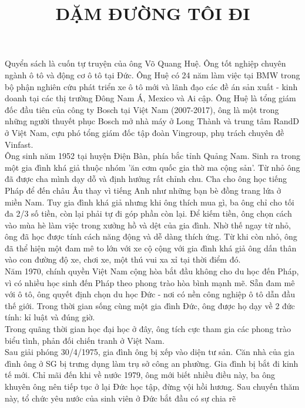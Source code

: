 \documentclass{article}
\title{DẶM ĐƯỜNG TÔI ĐI}
\newcommand\tab[1][1cm]{\hspace*{#1}}
\begin{document}
\maketitle

\tab Quyển sách là cuốn tự truyện của ông Võ Quang Huệ. Ông tốt nghiệp chuyên ngành ô tô và động cơ ô tô tại Đức.
Ông Huệ có 24 năm làm việc tại BMW trong bộ phận nghiên cứu phát triển xe ô tô mới và lãnh đạo các đề án
sản xuất - kinh doanh tại các thị trường Đông Nam Á, Mexico và Ai cập. Ông Huệ là tổng giám đốc đầu tiên của công 
ty Bosch tại Việt Nam (2007-2017), ông là một trong những người thuyết phục Bosch mở nhà máy ở Long Thành và trung tâm
RandD ở Việt Nam, cựu phó tổng giám đốc tập đoàn Vingroup, phụ trách chuyên đề Vinfast.\\

\tab Ông sinh năm 1952 tại huyện Điện Bàn, phía bắc tỉnh Quảng Nam. Sinh ra trong một gia đình khá giả thuộc nhóm 
'ăn cơm quốc gia thờ ma cộng sản'. Từ nhỏ ông đã được cha mình dạy dỗ và định hướng rất chỉnh chu. Cha cho ông học 
tiếng Pháp để đến châu Âu thay vì tiếng Anh như những bạn bè đồng trang lứa ở miền Nam. Tuy gia đình khá giả nhưng 
khi ông thích mua gì, ba ông chỉ cho tối đa 2/3 số tiền, còn lại phải tự đi góp phần còn lại. Để kiếm tiền, 
ông chọn cách vào mùa hè làm việc trong xưởng hồ và dệt của gia đình. Nhờ thế ngay từ nhỏ, ông đã học được tính cách 
năng động và dễ dàng thích ứng. Từ khi còn nhỏ, ông đã thể hiện một đam mê to lớn với xe cộ cộng với gia đình khá giả
ông dấn thân vào con đường độ xe, chơi xe, một thú vui xa xỉ tại thời điểm đó. \\
\tab Năm 1970, chính quyền Việt Nam cộng hòa bắt đầu không cho du học đến Pháp, vì có nhiều học sinh đến Pháp theo 
phong trào hòa bình mạnh mẽ. Sẵn đam mê với ô tô, ông quyết định chọn du học Đức - nơi có nền công nghiệp ô tô dẫn 
đầu thế giới. Trong thời gian sống cùng một gia đình Đức, ông được họ dạy về 2 đức tính: kỉ luật và đúng giờ.\\
\tab Trong quãng thời gian học đại học ở đây, ông tích cực tham gia các phong trào biểu tình, phản đối chiến tranh ở 
Việt Nam.\\
\tab Sau giải phóng 30/4/1975, gia đình ông bị xếp vào diện tư sản. Căn nhà của gia đình ông ở SG bị trưng dụng làm 
trụ sở công an phường. Gia đình bị bắt đi kinh tế mới. Chỉ mãi đến khi về nước 1979, ông mới biết nhiều điều này, ba
ông khuyên ông nên tiếp tục ở lại Đức học tập, đừng vội hồi hương. Sau chuyến thăm này, tổ chức yêu nước của sinh viên
ở Đức bắt đầu có sự chia rẽ
\end{document}
